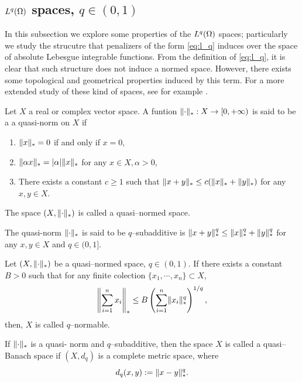 		\subsection{$L^q(\Omega)$ spaces, $q\in (0,1)$}
		In this subsection we explore some properties of the $L^q(\Omega)$ spaces; particularly
		we study the strucutre that penalizers of the form \eqref{eq:l_q} induces over the 
		space of absolute Lebesgue integrable functions. From the definition of \eqref{eq:l_q},
		it is clear that such structure does not induce a normed space. However, there exists
		some topological and geometrical properties induced by this term. For a more extended 
		study of these kind of spaces, see for example \cite[Chapter 25]{geometry_banach_spaces}.
		\begin{definition}		
		Let $X$ a real or complex vector space. A funtion $\lVert \cdot \rVert_{*}:X\to [0,+\infty)$ is said 
		to be a a quasi-norm on $X$ if
		\begin{enumerate}
			\item $\lVert x \rVert_{*}=0$ if and only if $x=0$,
			\item $\lVert \alpha x \rVert_{*}=|\alpha|\lVert x \rVert_{*}$ for any $x\in X, \alpha>0$,
			\item There exists a constant $c\ge 1$ such that $\lVert x+y \rVert_{*}\le c(\lVert x \rVert_{*}+\lVert y \rVert_{*})$ for any $x,y\in X$.
		\end{enumerate}
		The space $(X, \lVert \cdot \rVert_{*})$ is called a quasi--normed space.
		\end{definition}
		\begin{definition}
		The quasi-norm $\lVert \cdot \rVert_{*}$ is said to be $q$--subadditive is $\lVert x+y \rVert_{*}^{q}\le \lVert x \rVert_{*}^q+\lVert y \rVert_{*}^q$ 
		for any $x,y\in X$ and $q\in (0,1]$.
		\end{definition}

		\begin{definition}
		Let $(X, \lVert \cdot \rVert_{*})$ be a quasi--normed space, $q\in (0,1)$. If there exists a constant $B>0$ such that for any finite colection
		$\{x_1,\cdots,x_n\}\subset X$,
		\[
		\left\|\sum_{i=1}^n x_i\right\|_{*}\le B\left(\sum_{i=1}^{n}\lVert x_i \rVert_{*}^q\right)^{1/q},
		\]
		then, $X$ is called $q$--normable. 
		\end{definition}

		\begin{definition}
		If $\lVert \cdot \rVert_{*}$ is a quasi-
		norm and $q$--subadditive, then the space $X$ is called
		a quasi--Banach space if $(X, d_q)$ is a complete metric space, where
		\[
		d_q(x,y):=\lVert x-y \rVert_{*}^q.
		\]
		\end{definition}
		
